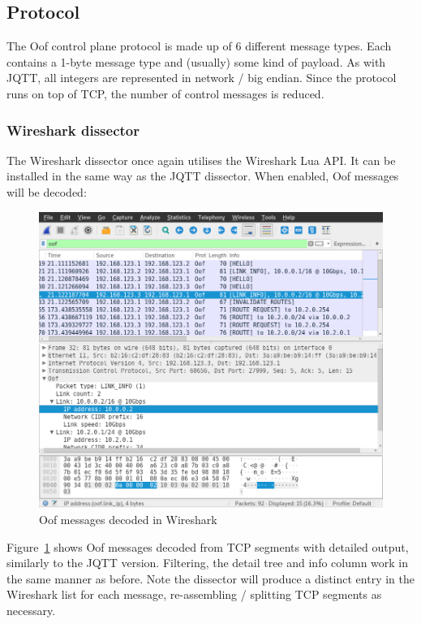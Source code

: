 \documentclass[a4paper]{article}
\numberwithin{figure}{section}
\numberwithin{table}{section}
\begin{document}
\newpage
\subsection{Protocol} \label{sec:protocol}
The Oof control plane protocol is made up of 6 different message types. Each contains a 1-byte message type and (usually) some kind of payload. As with JQTT, all integers are represented in network / big endian. Since the protocol runs on top of TCP, the number of control messages is reduced.

\subsubsection{Wireshark dissector}
The Wireshark dissector once again utilises the Wireshark Lua API. It can be installed in the same way as the JQTT dissector. When enabled, Oof messages will be decoded:

\begin{figure}[h!]
	\centering
	\includegraphics[width=\textwidth]{dissector}
	\caption{Oof messages decoded in Wireshark}
	\label{fig:dissector}
\end{figure}

Figure~\ref{fig:dissector} shows Oof messages decoded from TCP segments with detailed output, similarly to the JQTT version. Filtering, the detail tree and info column work in the same manner as before. Note the dissector will produce a distinct entry in the Wireshark list for each message, re-assembling / splitting TCP segments as necessary.
\end{document}
